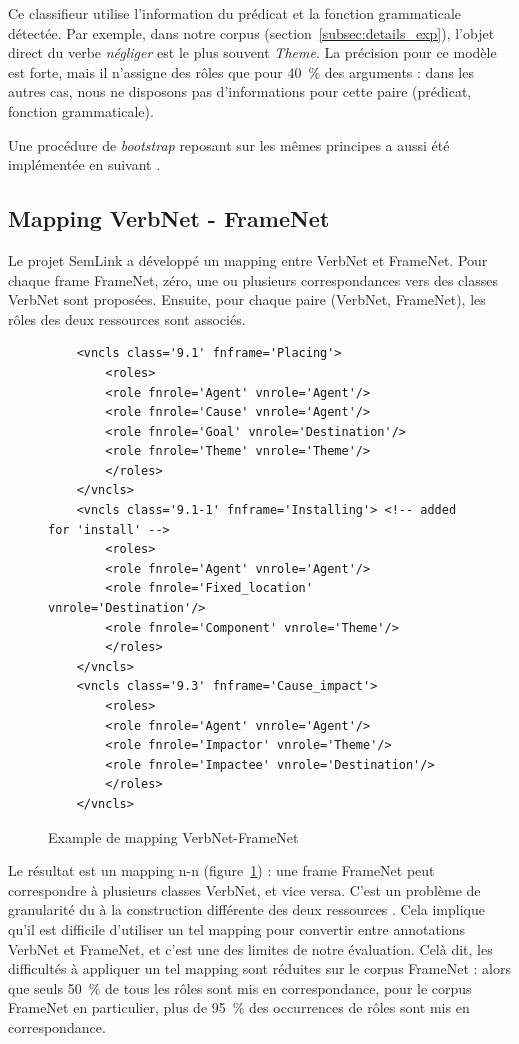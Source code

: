 Ce classifieur utilise l'information du prédicat et la fonction grammaticale
détectée. Par exemple, dans notre corpus (section~\ref{subsec:details_exp}),
l'objet direct du verbe \textit{négliger} est le plus souvent \textit{Theme}. La
précision pour ce modèle est forte, mais il n'assigne des rôles que pour 40~\%
des arguments : dans les autres cas, nous ne disposons pas d'informations pour
cette paire (prédicat, fonction grammaticale).

Une procédure de \textit{bootstrap} reposant sur les mêmes principes a aussi
été implémentée en suivant \cite{swier2004unsupervised}.

\subsection{Mapping VerbNet - FrameNet}
\label{subsec:mapping}

Le projet SemLink a développé un mapping entre VerbNet et FrameNet. Pour chaque
frame FrameNet, zéro, une ou plusieurs correspondances vers des classes VerbNet
sont proposées. Ensuite, pour chaque paire (VerbNet, FrameNet), les rôles des
deux ressources sont associés.

\begin{figure}[ht]
    \begin{verbatim}
    <vncls class='9.1' fnframe='Placing'>
        <roles>
        <role fnrole='Agent' vnrole='Agent'/>
        <role fnrole='Cause' vnrole='Agent'/>
        <role fnrole='Goal' vnrole='Destination'/>
        <role fnrole='Theme' vnrole='Theme'/>
        </roles>
    </vncls>
    <vncls class='9.1-1' fnframe='Installing'> <!-- added for 'install' -->
        <roles>
        <role fnrole='Agent' vnrole='Agent'/>
        <role fnrole='Fixed_location' vnrole='Destination'/>
        <role fnrole='Component' vnrole='Theme'/>
        </roles>
    </vncls>
    <vncls class='9.3' fnframe='Cause_impact'>
        <roles>
        <role fnrole='Agent' vnrole='Agent'/>
        <role fnrole='Impactor' vnrole='Theme'/>
        <role fnrole='Impactee' vnrole='Destination'/>
        </roles>
    </vncls>
    \end{verbatim}
    \caption{\label{fig:mapping}Example de mapping VerbNet-FrameNet}
\end{figure}

Le résultat est un mapping n-n (figure~\ref{fig:mapping}) : une frame FrameNet
peut correspondre à plusieurs classes VerbNet, et vice versa. C'est un problème
de granularité du à la construction différente des deux ressources
\citep{palmer2009semlink}. Cela implique qu'il est difficile d'utiliser un tel
mapping pour convertir entre annotations VerbNet et FrameNet, et c'est une des
limites de notre évaluation.  Celà dit, les difficultés à appliquer un tel
mapping sont réduites sur le corpus FrameNet : alors que seuls 50~\% de tous
les rôles sont mis en correspondance, pour le corpus FrameNet en particulier,
plus de 95~\% des occurrences de rôles sont mis en correspondance.

